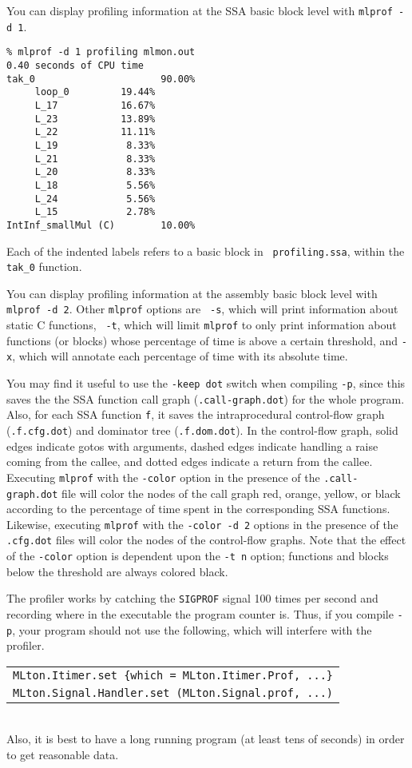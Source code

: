 You can display profiling information at the SSA basic block level
with {\tt mlprof -d 1}.

\begin{verbatim}
% mlprof -d 1 profiling mlmon.out
0.40 seconds of CPU time
tak_0                      90.00%
     loop_0         19.44%       
     L_17           16.67%       
     L_23           13.89%       
     L_22           11.11%       
     L_19            8.33%       
     L_21            8.33%       
     L_20            8.33%       
     L_18            5.56%       
     L_24            5.56%       
     L_15            2.78%       
IntInf_smallMul (C)        10.00%
\end{verbatim}
Each of the indented labels refers to a basic block in {\tt
  profiling.ssa}, within the {\tt tak\_0} function.

You can display profiling information at the assembly basic block
level with {\tt mlprof -d 2}.  Other {\tt mlprof} options are {\tt
  -s}, which will print information about static C functions, {\tt
  -t}, which will limit {\tt mlprof} to only print information about
functions (or blocks) whose percentage of time is above a certain
threshold, and {\tt -x}, which will annotate each percentage of time
with its absolute time.

You may find it useful to use the {\tt -keep dot} switch when
compiling {\tt -p}, since this saves the the SSA function call graph
({\tt .call-graph.dot}) for the whole program.  Also, for each SSA
function {\tt f}, it saves the intraprocedural control-flow graph
({\tt .f.cfg.dot}) and dominator tree ({\tt .f.dom.dot}).  In the
control-flow graph, solid edges indicate gotos with arguments, dashed
edges indicate handling a raise coming from the callee, and dotted
edges indicate a return from the callee.  Executing {\tt mlprof} with
the {\tt -color} option in the presence of the {\tt .call-graph.dot}
file will color the nodes of the call graph red, orange, yellow, or
black according to the percentage of time spent in the corresponding
SSA functions.  Likewise, executing {\tt mlprof} with the {\tt -color
  -d 2} options in the presence of the {\tt .cfg.dot} files will color
the nodes of the control-flow graphs.  Note that the effect of the
{\tt -color} option is dependent upon the {\tt -t n} option; functions
and blocks below the threshold are always colored black.

The profiler works by catching the {\tt SIGPROF} signal 100 times per
second and recording where in the executable the program counter is.
Thus, if you compile {\tt -p}, your program should not use the
following, which will interfere with
the profiler.\\
\begin{tabular}{l}
\tt MLton.Itimer.set \{which = MLton.Itimer.Prof, ...\}\\
\tt MLton.Signal.Handler.set (MLton.Signal.prof, ...)
\end{tabular}\\
Also, it is best to have a long running program (at least tens of
seconds) in order to get reasonable data.

